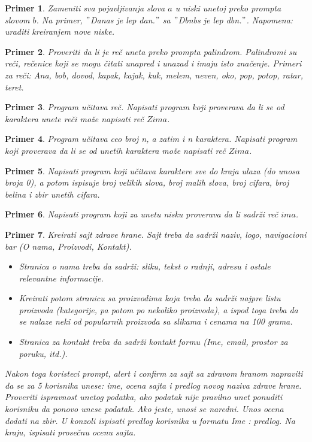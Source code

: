 \documentclass[a4paper]{article}
\newtheorem{primer}{Primer}[section]
\begin{document}
\begin{primer}
Zameniti sva pojavljivanja slova $a$ u niski unetoj preko prompta slovom $b$. Na primer, $"$Danas je lep dan.$"$ sa $"$Dbnbs je lep dbn.$"$. Napomena: uraditi kreiranjem nove niske.
\end{primer}

\begin{primer}
Proveriti da li je reč uneta preko prompta palindrom. Palindromi su reči, rečenice koji se mogu čitati unapred i unazad i imaju isto značenje. Primeri za reči: Ana, bob, dovod, kapak, kajak, kuk, melem, neven, oko, pop, potop, ratar, teret. 
\end{primer}

\begin{primer}
Program učitava reč. Napisati
program koji proverava da li se od karaktera unete reči može napisati reč $Zima$.
\end{primer}

\begin{primer}
Program učitava ceo broj n, a zatim i n karaktera. Napisati
program koji proverava da li se od unetih karaktera može napisati reč $Zima$.
\end{primer}

\begin{primer}
Napisati program koji učitava karaktere sve do kraja ulaza (do unosa broja 0), a potom ispisuje broj velikih slova, broj malih slova, broj cifara, broj belina i zbir unetih cifara. 
\end{primer}

\begin{primer}
Napisati program koji za unetu nisku proverava da li sadrži reč $ima$.
\end{primer}

\begin{primer}
Kreirati sajt zdrave hrane. Sajt treba da sadrži naziv, logo, navigacioni bar (O nama, Proizvodi, Kontakt). 
\begin{itemize}
    \item Stranica o nama treba da sadrži: sliku, tekst o radnji, adresu i ostale relevantne informacije. 
    \item Kreirati potom stranicu sa proizvodima koja treba da sadrži najpre listu proizvoda (kategorije, pa potom po nekoliko proizvoda), a ispod toga treba da se nalaze neki od popularnih proizvoda sa slikama i cenama na 100 grama. 
    \item Stranica za kontakt treba da sadrži kontakt formu (Ime, email, prostor za poruku, itd.).  
\end{itemize}

Nakon toga koristeci prompt, alert i confirm za sajt sa zdravom hranom napraviti da se za 5 korisnika unese: ime, ocena sajta i predlog novog naziva zdrave hrane. Proveriti ispravnost unetog podatka, ako podatak nije pravilno unet ponuditi korisniku da ponovo unese podatak. Ako jeste, unosi se naredni. Unos ocena dodati na zbir. U konzoli ispisati predlog korisnika u formatu Ime : predlog. Na kraju, ispisati prosečnu ocenu sajta.
\end{primer}
\end{document}
